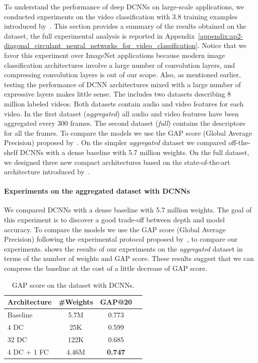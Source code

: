 To understand the performance of deep DCNNs on large-scale applications, we conducted experiments on the \yt video classification with 3.8 training examples introduced by~\citet{abu2016youtube}.
This section provides a summary of the results obtained on the \yt dataset, the full experimental analysis is reported in Appendix~\ref{appendix:ap2-diagonal_circulant_neural_networks_for_video_classification}.
Notice that we favor this experiment over ImageNet applications because modern image classification architectures involve a large number of convolution layers, and compressing convolution layers is out of our scope. 
Also, as mentioned earlier, testing the performance of DCNN architectures mixed with a large number of expressive layers makes little sense.
The \yt includes two datasets describing 8 million labeled videos.
Both datasets contain audio and video features for each video.
In the first dataset (\emph{aggregated}) all audio and video features have been aggregated every 300 frames.
The second dataset (\emph{full}) contains the descriptors for all the frames.
To compare the models we use the GAP score (Global Average Precision) proposed by~\citet{abu2016youtube}.
On the simpler \emph{aggregated} dataset we compared off-the-shelf DCNNs with a dense baseline with 5.7 million weights.
On the full dataset, we designed three new compact architectures based on the state-of-the-art architecture introduced by~\citet{abu2016youtube}. 

\paragraph{Experiments on the aggregated dataset with DCNNs}
We compared DCNNs with a dense baseline with 5.7 million weights.
The goal of this experiment is to discover a good trade-off between depth and model accuracy.
To compare the models we use the GAP score (Global Average Precision) following the experimental protocol proposed by~\citet{abu2016youtube}, to compare our experiments. 
 shows the results of our experiments on the \emph{aggregated} \yt dataset in terms of the number of weights and GAP score.
These results suggest that we can compress the baseline at the cost of a little decrease of GAP score.

\begin{table}
  \centering
  \begin{tabular}{lccc}
    \toprule
    \textbf{Architecture} & \textbf{\#Weights} & \textbf{GAP@20} \\
    \midrule
    Baseline    & 5.7M  & 0.773          \\
    4 DC        & 25K   & 0.599          \\
    32 DC       & 122K  & 0.685          \\
    4 DC + 1 FC & 4.46M & \textbf{0.747} \\
    \bottomrule
  \end{tabular}
  \caption{GAP score on the \yt dataset with DCNNs.}
  \label{table:youtube_agg_xp}
\end{table}


